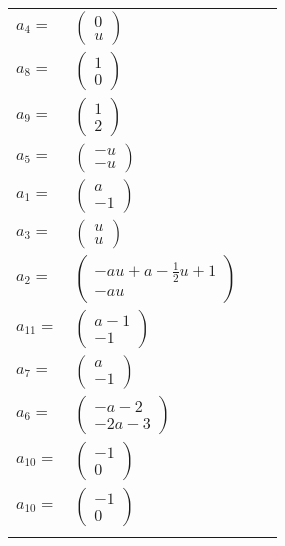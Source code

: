 \documentclass[1p]{elsarticle_modified}
\theoremstyle{definition}
\begin{document}
\begin{tabular}{m{7pt} m{180pt} m{7pt} m{180pt} }
\flushright $a_{4}=$&$\begin{pmatrix}0\\u\end{pmatrix}$ \\
\flushright $a_{8}=$&$\begin{pmatrix}1\\0\end{pmatrix}$ \\
\flushright $a_{9}=$&$\begin{pmatrix}1\\2\end{pmatrix}$ \\
\flushright $a_{5}=$&$\begin{pmatrix}- u\\- u\end{pmatrix}$ \\
\flushright $a_{1}=$&$\begin{pmatrix}a\\-1\end{pmatrix}$ \\
\flushright $a_{3}=$&$\begin{pmatrix}u\\u\end{pmatrix}$ \\
\flushright $a_{2}=$&$\begin{pmatrix}- a u+a-\frac{1}{2} u+1\\- a u\end{pmatrix}$ \\
\flushright $a_{11}=$&$\begin{pmatrix}a-1\\-1\end{pmatrix}$ \\
\flushright $a_{7}=$&$\begin{pmatrix}a\\-1\end{pmatrix}$ \\
\flushright $a_{6}=$&$\begin{pmatrix}- a-2\\-2 a-3\end{pmatrix}$ \\
\flushright $a_{10}=$&$\begin{pmatrix}-1\\0\end{pmatrix}$\\ \flushright $a_{10}=$&$\begin{pmatrix}-1\\0\end{pmatrix}$\\&\end{tabular}
\end{document}
